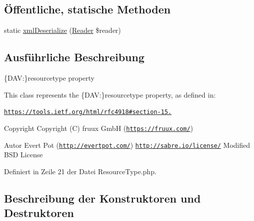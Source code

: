 \subsection*{Öffentliche, statische Methoden}
\begin{DoxyCompactItemize}
\item 
static \mbox{\hyperlink{class_sabre_1_1_d_a_v_1_1_xml_1_1_property_1_1_resource_type_adef04ac0175c27977f6b038768537835}{xml\+Deserialize}} (\mbox{\hyperlink{class_sabre_1_1_xml_1_1_reader}{Reader}} \$reader)
\end{DoxyCompactItemize}


\subsection{Ausführliche Beschreibung}
\{D\+AV\+:\}resourcetype property

This class represents the \{D\+AV\+:\}resourcetype property, as defined in\+:

\href{https://tools.ietf.org/html/rfc4918#section-15.9}{\tt https\+://tools.\+ietf.\+org/html/rfc4918\#section-\/15.}

\begin{DoxyCopyright}{Copyright}
Copyright (C) fruux GmbH (\href{https://fruux.com/}{\tt https\+://fruux.\+com/}) 
\end{DoxyCopyright}
\begin{DoxyAuthor}{Autor}
Evert Pot (\href{http://evertpot.com/}{\tt http\+://evertpot.\+com/})  \href{http://sabre.io/license/}{\tt http\+://sabre.\+io/license/} Modified B\+SD License 
\end{DoxyAuthor}


Definiert in Zeile 21 der Datei Resource\+Type.\+php.



\subsection{Beschreibung der Konstruktoren und Destruktoren}
\mbox{\label{class_sabre_1_1_d_a_v_1_1_xml_1_1_property_1_1_resource_type_acefba16580025c64bac676b7c63d156e}} 

